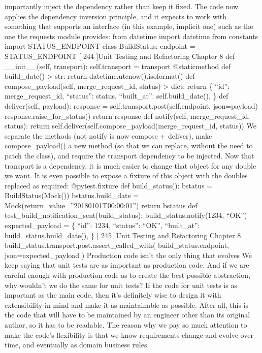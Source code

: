 \documentclass[a4paper,10pt,english]{sphinxmanual}
\begin{document}
importantly inject the dependency rather than keep it fixed. The code now applies
the dependency inversion principle, and it expects to work with something that supports
an interface (in this example, implicit one) such as the one the requests module provides:
from datetime import datetime
from constants import STATUS\_ENDPOINT
class BuildStatus:
endpoint = STATUS\_ENDPOINT
{[} 244 {]}Unit Testing and Refactoring
Chapter 8
def \_\_init\_\_(self, transport):
self.transport = transport
@staticmethod
def build\_date() \sphinxhyphen{}\textgreater{} str:
return datetime.utcnow().isoformat()
def compose\_payload(self, merge\_request\_id, status) \sphinxhyphen{}\textgreater{} dict:
return \{
“id”: merge\_request\_id,
“status”: status,
“built\_at”: self.build\_date(),
\}
def deliver(self, payload):
response = self.transport.post(self.endpoint, json=payload)
response.raise\_for\_status()
return response
def notify(self, merge\_request\_id, status):
return self.deliver(self.compose\_payload(merge\_request\_id, status))
We separate the methods (not notify is now compose + deliver),
make compose\_payload() a new method (so that we can replace, without the need to
patch the class), and require the transport dependency to be injected. Now that
transport is a dependency, it is much easier to change that object for any double we want.
It is even possible to expose a fixture of this object with the doubles replaced as required:
@pytest.fixture
def build\_status():
bstatus = BuildStatus(Mock())
bstatus.build\_date = Mock(return\_value=”2018\sphinxhyphen{}01\sphinxhyphen{}01T00:00:01”)
return bstatus
def test\_build\_notification\_sent(build\_status):
build\_status.notify(1234, “OK”)
expected\_payload = \{
“id”: 1234,
“status”: “OK”,
“built\_at”: build\_status.build\_date(),
\}
{[} 245 {]}Unit Testing and Refactoring
Chapter 8
build\_status.transport.post.assert\_called\_with(
build\_status.endpoint, json=expected\_payload
)
Production code isn’t the only thing that evolves
We keep saying that unit tests are as important as production code. And if we are careful
enough with production code as to create the best possible abstraction, why wouldn’t we
do the same for unit tests?
If the code for unit tests is as important as the main code, then it’s definitely wise to design
it with extensibility in mind and make it as maintainable as possible. After all, this is the
code that will have to be maintained by an engineer other than its original author, so it has
to be readable.
The reason why we pay so much attention to make the code’s flexibility is that we know
requirements change and evolve over time, and eventually as domain business rules
\end{document}
